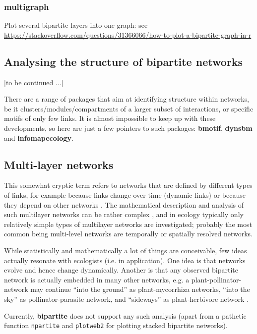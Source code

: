 \documentclass[a4paper, 11pt]{article}\usepackage[]{graphicx}\usepackage[]{color}
\newcommand{\package}[1]{\textbf{#1}}
\newcommand{\code}[1]{\texttt{#1}}
\begin{document}
\subsubsection{\package{multigraph}}
Plot several bipartite layers into one graph: see \url{https://stackoverflow.com/questions/31366066/how-to-plot-a-bipartite-graph-in-r}



\subsection{Analysing the structure of bipartite networks}
[to be continued ...]

There are a range of packages that aim at identifying structure within networks, be it clusters/modules/compartments of a larger subset of interactions, or specific motifs of only few links. It is almost impossible to keep up with these developments, so here are just a few pointers to such packages: \package{bmotif}, \package{dynsbm} and \package{infomapecology}.


\subsection{Multi-layer networks}
This somewhat cryptic term refers to networks that are defined by different types of links, for example because links change over time (dynamic links) or because they depend on other networks \citep{Pilosof2017}. The mathematical description and analysis of such multilayer networks can be rather complex \citep{Aleta2019}, and in ecology typically only relatively simple types of multilayer networks are investigated; probably the most common being multi-level networks are temporally or spatially resolved networks.

While statistically and mathematically a lot of things are conceivable, few ideas actually resonate with ecologists (i.e. in application). One idea is that networks evolve and hence change dynamically. Another is that any observed bipartite network is actually embedded in many other networks, e.g. a plant-pollinator-network may continue ``into the ground'' as plant-mycorrhiza networks, ``into the sky'' as pollinator-parasite network, and ``sideways'' as plant-herbivore network \citep{Pocock2012}. 

Currently, \package{bipartite} does not support any such analysis (apart from a pathetic function \code{npartite} and \code{plotweb2} for plotting stacked bipartite networks).
\end{document}
